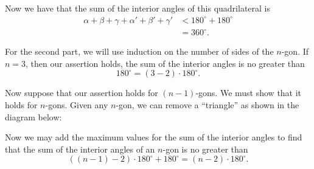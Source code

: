 \documentclass[instructornotes]{ximera}
\begin{document}
\begin{problem}
\begin{freeResponse}
\begin{image}
\end{image}
Now we have that the sum of the interior angles of this quadrilateral
is
\begin{align*}
\alpha + \beta + \gamma + \alpha'+\beta' + \gamma' &< 180^\circ + 180^\circ\\
&= 360^\circ. 
\end{align*}

For the second part, we will use induction on the number of sides of
the $n$-gon. If $n=3$, then our assertion holds, the sum of the interior angles is no greater than 
\[
180^\circ = (3-2) \cdot 180^\circ. 
\]

Now suppose that our assertion holds for $(n-1)$-gons. We must show
that it holds for $n$-gons. Given any $n$-gon, we can remove a
``triangle'' as shown in the diagram below:
\begin{image}
\end{image}
Now we may add the maximum values for the sum of the interior angles
to find that the sum of the interior angles of an $n$-gon is no
greater than
\[
((n-1)-2)\cdot 180^\circ + 180^\circ = (n-2)\cdot 180^\circ.
\]
\end{freeResponse}

\end{problem}
\end{document}
